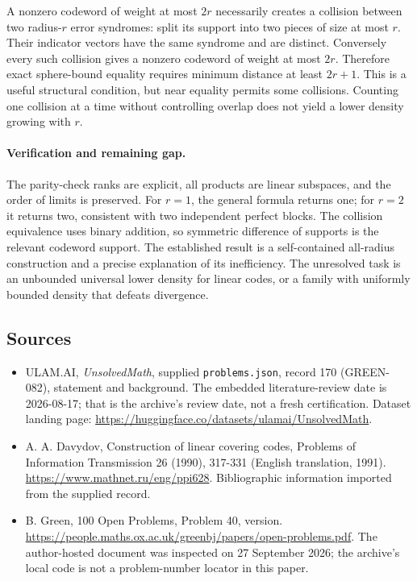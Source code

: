 \documentclass[11pt,a4paper]{article}
\begin{document}
A nonzero codeword of weight at most $2r$ necessarily creates a collision between two radius-$r$ error syndromes: split its support into two pieces of size at most $r$. Their indicator vectors have the same syndrome and are distinct. Conversely every such collision gives a nonzero codeword of weight at most $2r$. Therefore exact sphere-bound equality requires minimum distance at least $2r+1$. This is a useful structural condition, but near equality permits some collisions. Counting one collision at a time without controlling overlap does not yield a lower density growing with $r$.

\paragraph{Verification and remaining gap.}
The parity-check ranks are explicit, all products are linear subspaces, and the order of limits is preserved. For $r=1$, the general formula returns one; for $r=2$ it returns two, consistent with two independent perfect blocks. The collision equivalence uses binary addition, so symmetric difference of supports is the relevant codeword support. The established result is a self-contained all-radius construction and a precise explanation of its inefficiency. The unresolved task is an unbounded universal lower density for linear codes, or a family with uniformly bounded density that defeats divergence.

\subsection{Sources}

{\small

\begin{itemize}

\item[\hypertarget{source:170:1}{S1}] ULAM.AI, \emph{UnsolvedMath}, supplied \texttt{problems.json}, record 170 (GREEN-082), statement and background. The embedded literature-review date is 2026-08-17; that is the archive’s review date, not a fresh certification. Dataset landing page: \url{https://huggingface.co/datasets/ulamai/UnsolvedMath}.

\item[\hypertarget{source:170:2}{S2}] A. A. Davydov, Construction of linear covering codes, Problems of Information Transmission 26 (1990), 317-331 (English translation, 1991). \url{https://www.mathnet.ru/eng/ppi628}. Bibliographic information imported from the supplied record.

\item[\hypertarget{source:170:3}{S3}] B. Green, 100 Open Problems, Problem 40, version. \url{https://people.maths.ox.ac.uk/greenbj/papers/open-problems.pdf}. The author-hosted document was inspected on 27 September 2026; the archive’s local code is not a problem-number locator in this paper.

\end{itemize}

}

\label{end:170}
\end{document}
